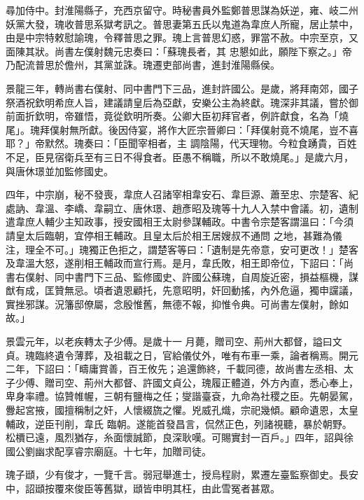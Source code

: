 \begin{pinyinscope}
 尋加侍中。封淮陽縣子，充西京留守。時秘書員外監鄭普思謀為妖逆，雍、岐二州妖黨大發，瑰收普思系獄考訊之。普思妻第五氏以鬼道為韋庶人所寵，居止禁中，由是中宗特敕慰諭瑰，令釋普思之罪。瑰上言普思幻惑，罪當不赦。中宗至京，又面陳其狀。尚書左僕射魏元忠奏曰：「蘇瑰長者，其
 忠懇如此，願陛下察之。」帝乃配流普思於儋州，其黨並誅。瑰遷吏部尚書，進封淮陽縣侯。



 景龍三年，轉尚書右僕射、同中書門下三品，進封許國公。是歲，將拜南郊，國子祭酒祝欽明希庶人旨，建議請皇后為亞獻，安樂公主為終獻。瑰深非其議，嘗於御前面折欽明，帝雖悟，竟從欽明所奏。公卿大臣初拜官者，例許獻食，名為「燒尾」。瑰拜僕射無所獻。後因侍宴，將作大匠宗晉卿曰：「拜僕射竟不燒尾，豈不喜耶？」帝默然。瑰奏曰：「臣聞宰相者，主
 調陰陽，代天理物。今粒食踴貴，百姓不足，臣見宿衛兵至有三日不得食者。臣愚不稱職，所以不敢燒尾。」是歲六月，與唐休璟並加監修國史。



 四年，中宗崩，秘不發喪，韋庶人召諸宰相韋安石、韋巨源、蕭至忠、宗楚客、紀處訥、韋溫、李嶠、韋嗣立、唐休璟、趙彥昭及瑰等十九人入禁中會議。初，遺制遣韋庶人輔少主知政事，授安國相王太尉參謀輔政。中書令宗楚客謂溫曰：「今須請皇太后臨朝，宜停相王輔政。且皇太后於相王居嫂叔不通問
 之地，甚難為儀注，理全不可。」瑰獨正色拒之，謂楚客等曰：「遺制是先帝意，安可更改！」楚客及韋溫大怒，遂削相王輔政而宣行焉。是月，韋氏敗，相王即帝位，下詔曰：「尚書右僕射、同中書門下三品、監修國史、許國公蘇瑰，自周旋近密，損益樞機，謀猷有成，匡贊無忌。頃者遺恩顧托，先意昭明，奸回動搖，內外危逼，獨申讜議，實挫邪謀。況籓邸僚屬，念殷惟舊，無德不報，抑惟令典。可尚書左僕射，餘如故。」



 景雲元年，以老疾轉太子少傅。是歲十一
 月薨，贈司空、荊州大都督，謚曰文貞。瑰臨終遺令薄葬，及祖載之日，官給儀仗外，唯有布車一乘，論者稱焉。開元二年，下詔曰：「疇庸賞善，百王攸先；追還飾終，千載同德，故尚書左丞相、太子少傅、贈司空、荊州大都督、許國文貞公，瑰履正體道，外方內直，悉心奉上，卑身率禮。協贊帷幄，三朝有鹽梅之任；燮諧臺袞，九命為社稷之臣。先朝晏駕，釁起宮掖，國擅稱制之奸，人懷綴旒之懼。兇威孔熾，宗祀幾傾。顧命遺恩，太皇輔政，逆臣刊削，韋氏
 臨朝。遂能首發昌言，侃然正色，列諸視聽，暴於朝野。松檟已遠，風烈猶存，糸面懷誠節，良深耿嘆。可賜實封一百戶。」四年，詔與徐國公劉幽求配享睿宗廟庭。十七年，加贈司徒。



 瑰子頲，少有俊才，一覽千言。弱冠舉進士，授烏程尉，累遷左臺監察御史。長安中，詔頲按覆來俊臣等舊獄，頲皆申明其枉，由此雪冤者甚眾。




\end{pinyinscope}
